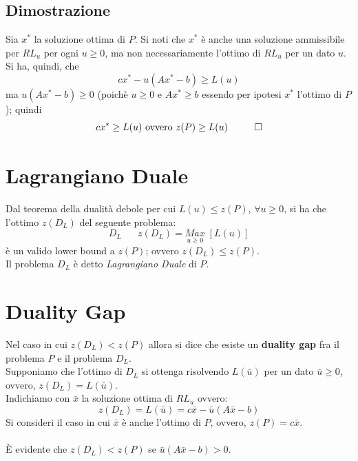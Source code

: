\subsection{Dimostrazione}
Sia $x^{*}$ la soluzione ottima di $P$. Si noti che $x^{*}$ è anche una soluzione ammissibile per $RL_{u}$ per ogni $u\ge 0$, ma non necessariamente l'ottimo di $RL_{u}$ per un dato $u$.\\
Si ha, quindi, che
\begin{equation}
	cx^{*}-u(Ax^{*}-b)\ge L(u)
\end{equation}
ma $u(Ax^{*}-b)\ge 0$ (poichè $u\ge 0$ e $Ax^{*}\ge b$ essendo per ipotesi $x^{*}$ l'ottimo di $P$); quindi
\begin{equation}
	cx^{*}\ge L(u)\textnormal{ ovvero }z(P)\ge L(u)\;\;\;\;\;\;\;\;\;\;\square
\end{equation}

\section{Lagrangiano Duale}
Dal teorema della dualità debole per cui $L(u)\le z(P)$, $\forall u\ge 0$, si ha che l'ottimo $z(D_{L})$ del seguente problema:
\begin{equation}
	D_{L}\;\;\;\;\;\;z(D_{L})=\underset{u\ge 0}{Max}\;[L(u)]
\end{equation}
è un valido lower bound a $z(P)$; ovvero $z(D_{L})\le z(P)$.\\
Il problema $D_{L}$ è detto \textit{Lagrangiano Duale} di $P$.

\section{Duality Gap}
Nel caso in cui $z(D_{L})<z(P)$ allora si dice che esiste un \textbf{duality gap} fra il problema $P$ e il problema $D_{L}$.\\
Supponiamo che l'ottimo di $D_{L}$ si ottenga risolvendo $L(\bar{u})$ per un dato $\bar{u}\ge 0$, ovvero, $z(D_{L})=L(\bar{u})$.\\
Indichiamo con $\bar{x}$ la soluzione ottima di $RL_{\bar{u}}$ ovvero:
\begin{equation}
	z(D_{L})=L(\bar{u})=c\bar{x}-\bar{u}(A\bar{x}-b)
\end{equation}
Si consideri il caso in cui $\bar{x}$ è anche l'ottimo di $P$, ovvero, $z(P)=c\bar{x}$.\\\\
È evidente che $z(D_{L})<z(P)$ se $\bar{u}(A\bar{x}-b)>0$.


